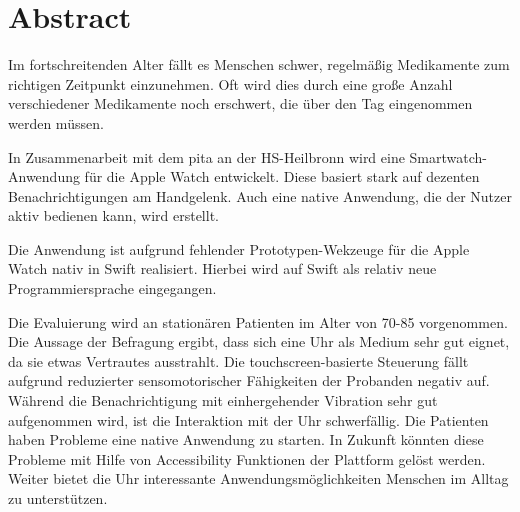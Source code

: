 

\section{Abstract}
Im fortschreitenden Alter fällt es Menschen schwer, regelmäßig Medikamente zum richtigen Zeitpunkt einzunehmen. Oft wird dies durch eine große Anzahl verschiedener Medikamente noch erschwert, die über den Tag eingenommen werden müssen. 

In Zusammenarbeit mit dem \gls{pita} an der HS-Heilbronn wird eine Smartwatch-Anwendung für die Apple Watch entwickelt. Diese basiert stark auf dezenten Benachrichtigungen am Handgelenk. Auch eine native Anwendung, die der Nutzer aktiv bedienen kann, wird erstellt.

Die Anwendung ist aufgrund fehlender Prototypen-Wekzeuge für die Apple Watch nativ in Swift realisiert. Hierbei wird auf Swift als relativ neue Programmiersprache eingegangen.

Die Evaluierung wird an stationären Patienten im Alter von 70-85 vorgenommen. Die Aussage der Befragung ergibt, dass sich eine Uhr als Medium sehr gut eignet, da sie etwas Vertrautes ausstrahlt. Die touchscreen-basierte Steuerung fällt aufgrund reduzierter sensomotorischer Fähigkeiten der Probanden negativ auf. Während die Benachrichtigung mit einhergehender Vibration sehr gut aufgenommen wird, ist die Interaktion mit der Uhr schwerfällig. Die Patienten haben Probleme eine native Anwendung zu starten. In Zukunft könnten diese Probleme mit Hilfe von Accessibility Funktionen der Plattform gelöst werden. Weiter bietet die Uhr interessante Anwendungsmöglichkeiten Menschen im Alltag zu unterstützen.

